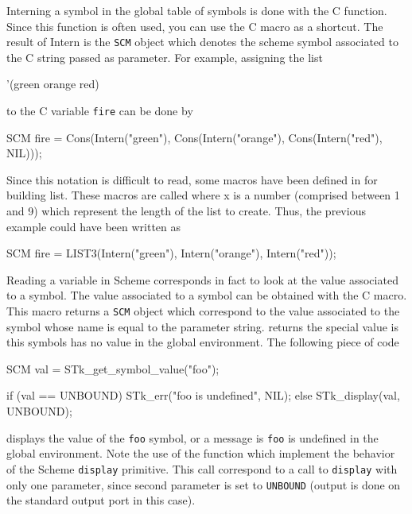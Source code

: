 \documentclass[10pt]{article}
\begin{document}
\begin{Lentry}
\item[Defining a symbol]
Interning a symbol in the global table of symbols is done with the
 C function. Since this function is often used, you can use
the C macro  as a shortcut. The result of Intern is the {\tt SCM}
object which denotes the scheme symbol associated to the C string passed as parameter.
For example, assigning the list 
\begin{Code}
\begin{listing}[200]{2}
'(green orange red)
\end{listing}
\end{Code}
to the C variable {\tt fire} can be done by
\begin{Code}
\begin{listing}[200]{2}
SCM fire =  Cons(Intern("green"),
                 Cons(Intern("orange"),
                      Cons(Intern("red"), NIL)));
\end{listing}
\end{Code}
Since this notation is difficult to read, some macros have been defined in
 for building list. These macros are called  where
x is a number (comprised between 1 and 9) which represent the length of the list
to create. Thus, the previous example could have been written as 
\begin{Code}
\begin{listing}[200]{2}
SCM fire =  LIST3(Intern("green"), Intern("orange"), Intern("red"));
\end{listing}
\end{Code}

\item[Reading a variable]
Reading a variable in Scheme corresponds in fact to look at the value associated
to a symbol. The value associated to a symbol can be obtained with the 
 C macro. This macro returns a {\tt SCM} object
which correspond to the value associated to the symbol whose name is equal to
the parameter string.  returns the special
value  is this symbols has no value in the global
environment. The following piece of code
\begin{Code}
\begin{listing}[200]{2}
{
  SCM val = STk_get_symbol_value("foo");

  if (val == UNBOUND)
    STk_err("foo is undefined", NIL);
  else
    STk_display(val, UNBOUND);
}
\end{listing}
\end{Code}
displays the value of the {\tt foo} symbol, or a message is {\tt foo} is undefined in the
global environment. Note the use of the  function which
implement the behavior of the Scheme {\tt display} primitive. This call correspond to
a call to {\tt display} with only one parameter, since second parameter is set
to {\tt UNBOUND} (output is done on the standard output port in this case).


\end{Lentry}
\end{document}

